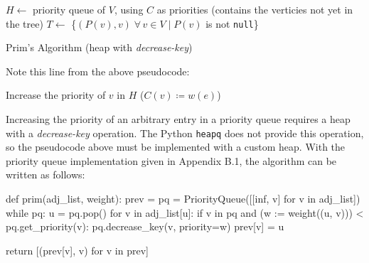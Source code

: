 \documentclass[12pt, titlepage]{article}
\begin{document}
\begin{algorithm}[H]
  \SetAlgoLined
  \DontPrintSemicolon
  $H \longleftarrow$\hspace{0.5mm} priority queue of $V$, using $C$ as priorities\;
  \hspace{13mm}(contains the verticies not yet in the tree)\;
    $T \longleftarrow$\hspace{0.5mm} \{$(P(v), v)\;\forall\,v\in V\mid P(v)$ is not \texttt{null}\}\;
  \;
    \caption{Prim's Algorithm (heap with \textit{decrease-key})}
\end{algorithm} \medskip

Note this line from the above pseudocode:
\begin{center}
Increase the priority of $v$ in $H$\hspace{4mm} ($C(v)\coloneqq w(e)$)
\end{center}
Increasing the priority of an arbitrary entry in a priority queue requires a heap with a \textit{decrease-key} operation. The Python \texttt{heapq} does not provide this operation, so the pseudocode above must be implemented with a custom heap. With the priority queue implementation given in Appendix B.1, the algorithm can be written as follows: \medskip

\begin{python}
def prim(adj_list, weight):
    prev = {}
    pq = PriorityQueue([[inf, v] for v in adj_list])
    while pq:
        u = pq.pop()
        for v in adj_list[u]:
            if v in pq and (w := weight((u, v))) < pq.get_priority(v):
                pq.decrease_key(v, priority=w)
                prev[v] = u

    return [(prev[v], v) for v in prev]
\end{python}
\end{document}
